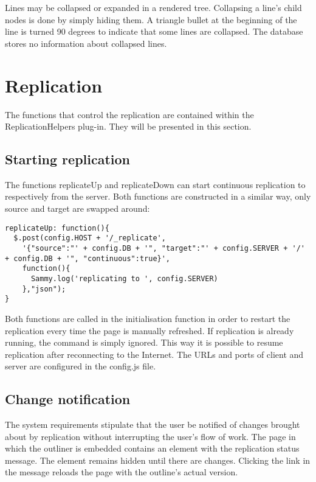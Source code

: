 Lines may be collapsed or expanded in a rendered tree. Collapsing a line's child nodes is done by simply hiding them. A triangle bullet at the beginning of the line is turned 90 degrees to indicate that some lines are collapsed. The database stores no information about collapsed lines.



\section{Replication}
\label{subsec:repl-impl}

The functions that control the replication are contained within the {\selectfont ReplicationHelpers} plug-in. They will be presented in this section.

\subsection{Starting replication}

The functions {\selectfont replicateUp} and {\selectfont replicateDown} can start continuous replication to respectively from the server. Both functions are constructed in a similar way, only source and target are swapped around:

\lstset{language=javascript}
\medskip 
\begin{lstlisting}[caption=The {\fontfamily{pcr}\selectfont replicateUp} function]
replicateUp: function(){
  $.post(config.HOST + '/_replicate', 
    '{"source":"' + config.DB + '", "target":"' + config.SERVER + '/' + config.DB + '", "continuous":true}',
    function(){
      Sammy.log('replicating to ', config.SERVER)
    },"json");
}
\end{lstlisting}

Both functions are called in the initialisation function in order to restart the replication every time the page is manually refreshed. If replication is already running, the command is simply ignored. This way it is possible to resume replication after reconnecting to the Internet. The URLs and ports of client and server are configured in the {\selectfont config.js} file.

\subsection{Change notification}
\label{subsec:nochanges}

The system requirements stipulate that the user be notified of changes brought about by replication without interrupting the user's flow of work. The page in which the outliner is embedded contains an element with the replication status message. The element remains hidden until there are changes. Clicking the link in the message reloads the page with the outline's actual version.



